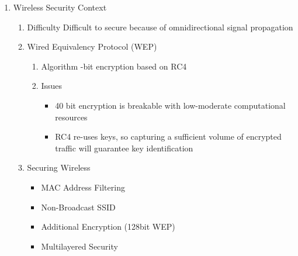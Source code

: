 \documentclass[a4paper,10pt]{article}
\begin{document}
\begin{enumerate}
\begin{enumerate}
      \item Wireless Security Context
        \begin{enumerate}
          \item Difficulty
            \newline Difficult to secure because of omnidirectional signal propagation
          \item Wired Equivalency Protocol (WEP)
            \begin{enumerate}
              \item Algorithm
                -bit encryption based on RC4
              \item Issues
                \begin{itemize}
                  \item 40 bit encryption is breakable with low-moderate computational resources
                  \item RC4 re-uses keys, so capturing a sufficient volume of encrypted traffic will guarantee key identification 
                \end{itemize}
            \end{enumerate}
          \item Securing Wireless
            \begin{itemize}
             \item MAC Address Filtering
             \item Non-Broadcast SSID
             \item Additional Encryption (128bit WEP)
             \item Multilayered Security
            \end{itemize}
        \end{enumerate}
    \end{enumerate}
    
\end{enumerate}
\end{document}
